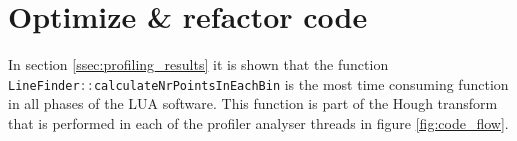 \section{Optimize \& refactor code} \label{sec:optimize} 
In section \ref{ssec:profiling_results} it is shown that the function \lstinline[language=c]|LineFinder::calculateNrPointsInEachBin| is the most time consuming function in all phases of the LUA software. This function is part of the Hough transform that is performed in each of the profiler
analyser threads in figure \ref{fig:code_flow}. 